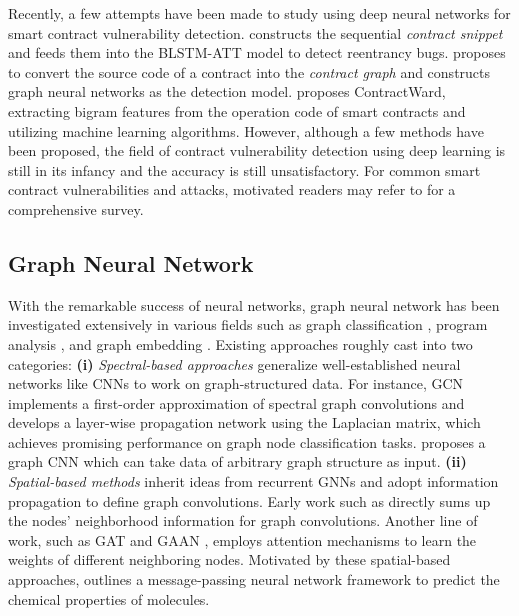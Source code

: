 Recently, a few attempts have been made to study using deep neural networks for smart contract vulnerability detection. \cite{pengqian} constructs the sequential \emph{contract snippet} and feeds them into the BLSTM-ATT model to detect reentrancy bugs. \cite{ijcai} proposes to convert the source code of a contract into the \emph{contract graph} and constructs graph neural networks as the detection model. \cite{wang2020contractward} proposes ContractWard, extracting bigram features from the operation code of smart contracts and utilizing machine learning algorithms. However, although a few methods have been proposed, the field of contract vulnerability detection using deep learning is still in its infancy and the accuracy is still unsatisfactory. For common smart contract vulnerabilities and attacks, motivated readers may refer to \cite{Sok} for a comprehensive survey. 

\vspace{-0.7em}
\subsection{Graph Neural Network}
With the remarkable success of neural networks, graph neural network has been investigated extensively in various fields such as graph classification \cite{Zhang,wang2016incremental}, program analysis \cite{devign,Miltiadis}, and graph embedding \cite{cai2018comprehensive}. Existing approaches roughly cast into two categories: \textbf{(i)} \emph{Spectral-based approaches} generalize well-established neural networks like CNNs to work on graph-structured data. For instance, GCN \cite{GCN} implements a first-order approximation of spectral graph convolutions \cite{Defferrard,zhou2018graph,wei2019mmgcn} and develops a layer-wise propagation network using the Laplacian matrix, which achieves promising performance on graph node classification tasks. \cite{adaptive} proposes a graph CNN which can take data of arbitrary graph structure as input. \textbf{(ii)} \emph{Spatial-based methods} inherit ideas from recurrent GNNs and adopt information propagation to define graph convolutions. Early work such as \cite{Micheli} directly sums up the nodes' neighborhood information for graph convolutions. Another line of work, such as GAT \cite{velivckovic2017graph} and GAAN \cite{zhang2018gaan}, employs attention mechanisms to learn the weights of different neighboring nodes. Motivated by these spatial-based approaches, \cite{gilmer2017neural} outlines a message-passing neural network framework to predict the chemical properties of molecules. 

